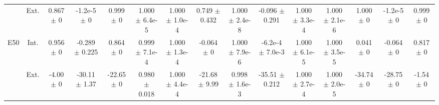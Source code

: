\begin{table}[htbp]
{\begin{tabular}{@{}ccccccccccccccc@{}}
 & Ext. & 0.867 $\pm$ 0 & -1.2e-5 $\pm$ 0 & 0.999 $\pm$ 0 & 1.000 $\pm$ 6.4e-5 & 1.000 $\pm$ 1.0e-4 & 0.749 $\pm$ 0.432 & 1.000 $\pm$ 2.4e-8 & -0.096 $\pm$ 0.291 & 1.000 $\pm$ 3.3e-4 & 1.000 $\pm$ 2.1e-6 & 1.000 $\pm$ 0 & -1.2e-5 $\pm$ 0 & 0.999 $\pm$ 0 \\
\cline{2-15}
\multirow{2}{*}{E50} & Int. & 0.956 $\pm$ 0 & -0.289 $\pm$ 0.225 & 0.864 $\pm$ 0 & 0.999 $\pm$ 7.1e-4 & 1.000 $\pm$ 1.3e-4 & -0.064 $\pm$ 0 & 1.000 $\pm$ 7.9e-6 & -6.2e-4 $\pm$ 7.0e-3 & 1.000 $\pm$ 6.1e-5 & 1.000 $\pm$ 3.5e-5 & 0.041 $\pm$ 0 & -0.064 $\pm$ 0 & 0.817 $\pm$ 0 \\
 & Ext. & -4.00 $\pm$ 0 & -30.11 $\pm$ 1.37 & -22.65 $\pm$ 0 & 0.980 $\pm$ 0.018 & 1.000 $\pm$ 4.4e-4 & -21.68 $\pm$ 9.99 & 0.998 $\pm$ 1.6e-3 & -35.51 $\pm$ 0.212 & 1.000 $\pm$ 2.7e-4 & 1.000 $\pm$ 2.0e-5 & -34.74 $\pm$ 0 & -28.75 $\pm$ 0 & -1.54 $\pm$ 0 \\
\bottomrule
\end{tabular}
}
\end{table}